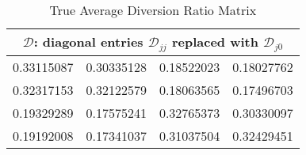 
\begin{table}
\centering
\begin{tabular}{ |cccc| }
 \hline
\multicolumn{4}{|c|}{$\mathcal{D}$: diagonal entries $\mathcal{D}_{jj}$ replaced with $\mathcal{D}_{j0}$}
 \\
 \hline
 0.33115087 & 0.30335128 & 0.18522023 & 0.18027762   \\
0.32317153 & 0.32122579 & 0.18063565 & 0.17496703  \\
0.19329289 & 0.17575241 & 0.32765373 & 0.30330097  \\
0.19192008 & 0.17341037 & 0.31037504 & 0.32429451  \\
 \hline
\end{tabular}
\label{table5_4}
\caption{True Average Diversion Ratio Matrix}
\end{table}
